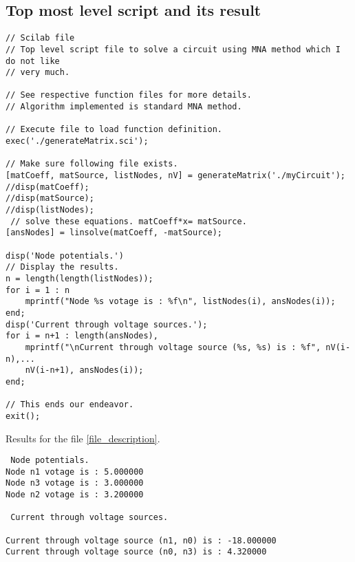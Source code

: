 \documentclass[a4paper,10pt]{article}
\begin{document}
\subsection{Top most level script and its result}
\small
\begin{verbatim}
// Scilab file
// Top level script file to solve a circuit using MNA method which I do not like
// very much.

// See respective function files for more details.
// Algorithm implemented is standard MNA method.

// Execute file to load function definition.
exec('./generateMatrix.sci');

// Make sure following file exists.
[matCoeff, matSource, listNodes, nV] = generateMatrix('./myCircuit');
//disp(matCoeff);
//disp(matSource);
//disp(listNodes);
 // solve these equations. matCoeff*x= matSource.
[ansNodes] = linsolve(matCoeff, -matSource);

disp('Node potentials.')
// Display the results.
n = length(length(listNodes));
for i = 1 : n
    mprintf("Node %s votage is : %f\n", listNodes(i), ansNodes(i));
end;
disp('Current through voltage sources.');
for i = n+1 : length(ansNodes),
    mprintf("\nCurrent through voltage source (%s, %s) is : %f", nV(i-n),...
    nV(i-n+1), ansNodes(i));
end;

// This ends our endeavor.
exit();
\end{verbatim}
Results for the file \ref{file_description}.
\begin{verbatim}
 Node potentials.
Node n1 votage is : 5.000000
Node n3 votage is : 3.000000
Node n2 votage is : 3.200000

 Current through voltage sources.

Current through voltage source (n1, n0) is : -18.000000
Current through voltage source (n0, n3) is : 4.320000
\end{verbatim}
\end{document}
